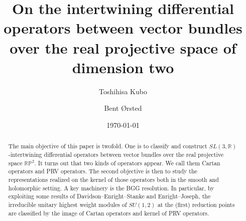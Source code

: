 \documentclass[reqno,11pt]{amsart}
\theoremstyle{remark}
\numberwithin{equation}{section}
\newcommand{\R}{\mathbb{R}}
\newcommand{\RP}{\mathbb{R}\mathbb{P}}
\begin{document}
\baselineskip=16pt
\tabulinesep=1.2mm


\title[]{On the intertwining differential operators between vector bundles 
over the real projective space of dimension two}


\author{Toshihisa Kubo}
\author{Bent {\O}rsted}

\address{Faculty of Economics, 
Ryukoku University,
67 Tsukamoto-cho, Fukakusa, Fushimi-ku, Kyoto 612-8577, Japan}

\address{Department of Mathematics, 
Aarhus University,
Ny Munkegade 118 DK-8000 Aarhus C Denmark}


\date{\today}

\maketitle


\begin{abstract} 
The main objective of this paper is twofold. One is to classify and construct 
$SL(3,\R)$-intertwining differential operators between vector bundles
over the real projective space $\RP^2$. 
It turns out that two kinds of operators appear. 
We call them Cartan operators and PRV operators.
The second objective is then to study the representations realized 
on the kernel of those operators both in the smooth and holomorphic setting.
A key machinery is the BGG resolution. 
In particular, by exploiting some results 
of Davidson--Enright--Stanke and Enright--Joseph, 
the irreducible unitary highest 
weight modules of $SU(1,2)$ at the (first) reduction points are classified by 
the image of Cartan operators and kernel of PRV operators.
\end{abstract}
\end{document}
